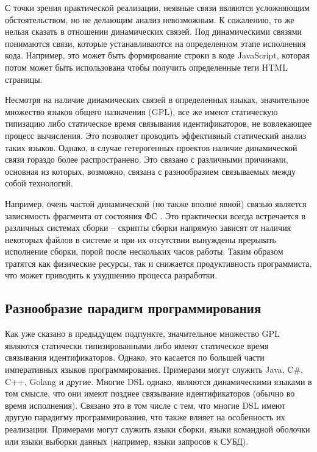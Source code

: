 С точки зрения практической реализации, неявные связи являются усложняющим обстоятельством, но не
делающим анализ невозможным. К сожалению, то же нельзя сказать в отношении динамических связей. Под
динамическими связями понимаются связи, которые устанавливаются на определенном этапе исполнения кода.
Например, это может быть формирование строки в коде JavaScript, которая потом может быть использована чтобы
получить определенные теги HTML страницы.

Несмотря на наличие динамических связей в определенных языках, значительное множество языков общего назначения (GPL), 
все же имеют статическую типизацию либо статическое время связывания идентификаторов, не вовлекающее процесс вычисления.
Это позволяет проводить эффективный статический анализ таких языков. Однако, в случае гетерогенных проектов наличие динамической
связи гораздо более распространено. Это связано с различными причинами, основная из которых, возможно,
связана с разнообразием связываемых между собой технологий. 

Например, очень частой динамической (но также вполне явной) связью является зависимость фрагмента от состояния ФС . Это практически всегда встречается
в различных системах сборки -- скрипты сборки напрямую зависят от наличия некоторых файлов в системе и
при их отсутствии вынуждены прерывать исполнение сборки, порой после нескольких часов работы. Таким образом
тратятся как физические ресурсы, так и снижается продуктивность программиста, что может приводить к
ухудшению процесса разработки.

\subsection{Разнообразие парадигм программирования}

Как уже сказано в предыдущем подпункте, значительное множество GPL являются статически типизированными
либо имеют статическое время связывания идентификаторов. Однако, это касается по большей части
императивных языков программирования. Примерами могут служить Java, C\#, C++, Golang и другие.
Многие DSL однако, являются динамическими языками в том смысле, что они имеют позднее
связывание идентификаторов (обычно во время исполнения). Связано это в том числе с тем, что многие DSL
имеют другую парадигму программирования, что также влияет на особенность их реализации. Примерами могут служить 
языки сборки, языки командной оболочки или языки выборки данных (например, языки запросов к СУБД).

